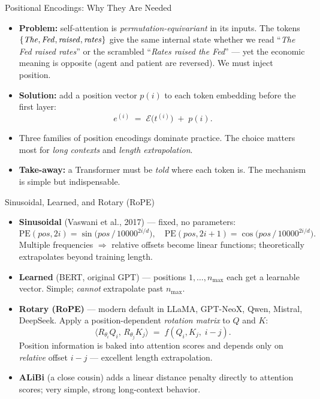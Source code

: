 \begin{frame}{Positional Encodings: Why They Are Needed}
\begin{itemize}
\item \textbf{Problem:} self-attention is \emph{permutation-equivariant} in its inputs. The tokens $\{\text{\emph{The}}, \text{\emph{Fed}}, \text{\emph{raised}}, \text{\emph{rates}}\}$ give the same internal state whether we read ``\emph{The Fed raised rates}'' or the scrambled ``\emph{Rates raised the Fed}'' --- yet the economic meaning is opposite (agent and patient are reversed). We must inject position.

\medskip
\item \textbf{Solution:} add a position vector $p(i)$ to each token embedding before the first layer:
\[
   e^{(i)} \;=\; \mathcal{E}\bigl(t^{(i)}\bigr) \;+\; p(i).
\]

\medskip
\item Three families of position encodings dominate practice. The choice matters most for \emph{long contexts} and \emph{length extrapolation}.

\medskip
\item \textbf{Take-away:} a Transformer must be \emph{told} where each token is. The mechanism is simple but indispensable.
\end{itemize}
\end{frame}

\begin{frame}{Sinusoidal, Learned, and Rotary (RoPE)}
\begin{itemize}
\item \textbf{Sinusoidal} (Vaswani et al., 2017) --- fixed, no parameters:
\[
   \mathrm{PE}(pos, 2i) = \sin\!\bigl(pos\,/\,10000^{2i/d}\bigr), \quad
   \mathrm{PE}(pos, 2i{+}1) = \cos\!\bigl(pos\,/\,10000^{2i/d}\bigr).
\]
Multiple frequencies $\Rightarrow$ relative offsets become linear functions; theoretically extrapolates beyond training length.

\medskip
\item \textbf{Learned} (BERT, original GPT) --- positions $1, \ldots, n_{\max}$ each get a learnable vector. Simple; \emph{cannot} extrapolate past $n_{\max}$.

\medskip
\item \textbf{Rotary (RoPE)} --- modern default in LLaMA, GPT-NeoX, Qwen, Mistral, DeepSeek. Apply a position-dependent \emph{rotation matrix} to $Q$ and $K$:
\[
   \langle R_{\theta_{i}} Q_i,\, R_{\theta_{j}} K_j\rangle \;=\; f(Q_i, K_j,\; i - j).
\]
Position information is baked into attention scores and depends only on \emph{relative} offset $i{-}j$ --- excellent length extrapolation.

\medskip
\item \textbf{ALiBi} (a close cousin) adds a linear distance penalty directly to attention scores; very simple, strong long-context behavior.
\end{itemize}
\end{frame}

